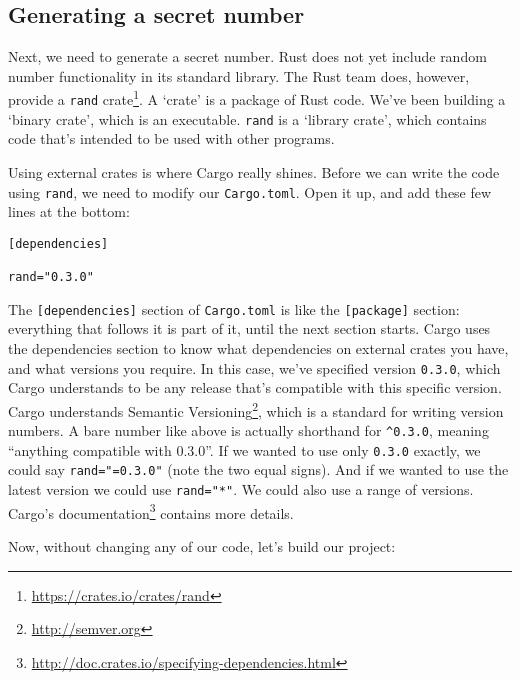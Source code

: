 \documentclass[a4paper,]{book}
\newenvironment{Shaded}{\begin{snugshade}}{\end{snugshade}}
\newcommand{\KeywordTok}[1]{\textcolor[rgb]{0.13,0.29,0.53}{\textbf{{#1}}}}
\newcommand{\NormalTok}[1]{{#1}}
\renewcommand{\href}[2]{#2\footnote{\url{#1}}}
\begin{document}
\subsection{Generating a secret
number}\label{generating-a-secret-number}

Next, we need to generate a secret number. Rust does not yet include
random number functionality in its standard library. The Rust team does,
however, provide a \href{https://crates.io/crates/rand}{\texttt{rand}
crate}. A `crate' is a package of Rust code. We've been building a
`binary crate', which is an executable. \texttt{rand} is a `library
crate', which contains code that's intended to be used with other
programs.

Using external crates is where Cargo really shines. Before we can write
the code using \texttt{rand}, we need to modify our \texttt{Cargo.toml}.
Open it up, and add these few lines at the bottom:

\begin{verbatim}
[dependencies]

rand="0.3.0"
\end{verbatim}

The \texttt{{[}dependencies{]}} section of \texttt{Cargo.toml} is like
the \texttt{{[}package{]}} section: everything that follows it is part
of it, until the next section starts. Cargo uses the dependencies
section to know what dependencies on external crates you have, and what
versions you require. In this case, we've specified version
\texttt{0.3.0}, which Cargo understands to be any release that's
compatible with this specific version. Cargo understands
\href{http://semver.org}{Semantic Versioning}, which is a standard for
writing version numbers. A bare number like above is actually shorthand
for \texttt{\^{}0.3.0}, meaning ``anything compatible with 0.3.0''. If
we wanted to use only \texttt{0.3.0} exactly, we could say
\texttt{rand="=0.3.0"} (note the two equal signs). And if we wanted to
use the latest version we could use \texttt{rand="*"}. We could also use
a range of versions.
\href{http://doc.crates.io/specifying-dependencies.html}{Cargo's
documentation} contains more details.

Now, without changing any of our code, let's build our project:

\begin{Shaded}
\end{Shaded}
\end{document}
